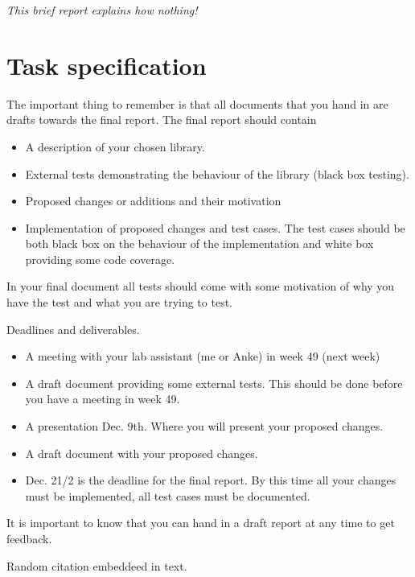 \textit{This brief report explains how nothing!}




\section{Task specification}

The important thing to remember is that all documents that you hand in are drafts towards the final report. The final report should contain

\begin{itemize}
    \item A description of your chosen library.
    \item External tests demonstrating the behaviour of the library (black box testing).
    \item Proposed changes or additions and their motivation
    \item Implementation of proposed changes and test cases. The test cases should be both black box on the behaviour of the implementation and white box providing some code coverage.
\end{itemize}

In your final document all tests should come with some motivation of why you
have the test and what you are trying to test.

Deadlines and deliverables.

\begin{itemize}
    \item A meeting with your lab assistant (me or Anke) in week 49 (next week)
    \item A draft document providing some external tests. This should be done before  you have a meeting in week 49.
    \item A presentation Dec. 9th. Where you will present your proposed changes.
    \item A draft document with your proposed changes.
    \item Dec. 21/2 is the deadline for the final report. By this time all your changes must be implemented, all test cases must be documented.
\end{itemize}
It is important to know that you can hand in a draft report at any
time to get feedback.


Random citation \cite{the_lexer_hack} embeddeed in text.

\newpage



